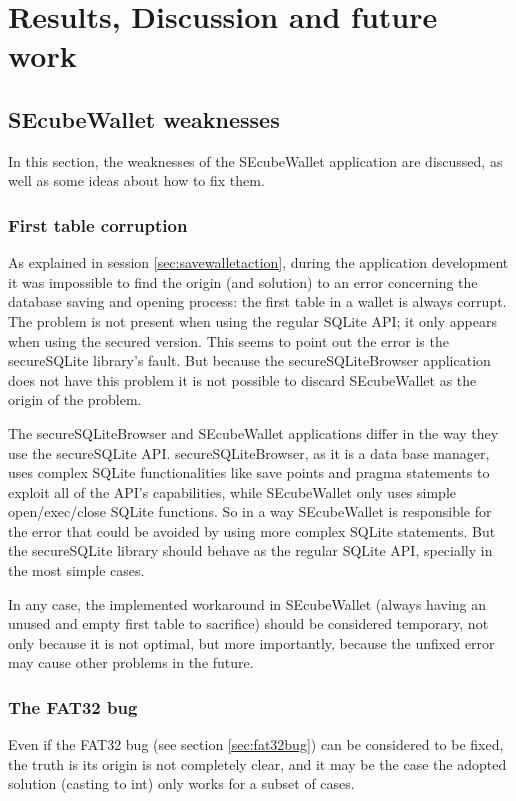 \chapter{Results, Discussion and future work}

\section{SEcubeWallet weaknesses}
In this section, the weaknesses of the SEcubeWallet application are discussed, as well as some ideas about how to fix them.


\subsection{First table corruption}
As explained in session \ref{sec:savewalletaction}, during the application development it was impossible to find the origin (and solution) to an error concerning the database saving and opening process: the first table in a wallet is always corrupt. The problem is not present when using the regular SQLite API; it only appears when using the secured version. This seems to point out the error is the secureSQLite library's fault. But because the secureSQLiteBrowser application does not have this problem it is not possible to discard SEcubeWallet as the origin of the problem.

The secureSQLiteBrowser and SEcubeWallet applications differ in the way they use the secureSQLite API. secureSQLiteBrowser, as it is a data base manager, uses complex SQLite functionalities like save points and pragma statements to exploit all of the API's capabilities, while SEcubeWallet only uses simple open/exec/close SQLite functions. So in a way SEcubeWallet is responsible for the error that could be avoided by using more complex SQLite statements. But the secureSQLite library should behave as the regular SQLite API, specially in the most simple cases.

In any case, the implemented workaround in SEcubeWallet (always having an unused and empty first table to sacrifice) should be considered temporary, not only because it is not optimal, but more importantly, because the unfixed error may cause other problems in the future.

\subsection{The FAT32 bug}

Even if the FAT32 bug (see section \ref{sec:fat32bug}) can be considered to be fixed, the truth is its origin is not completely clear, and it may be the case the adopted solution (casting to int) only works for a subset of cases.

